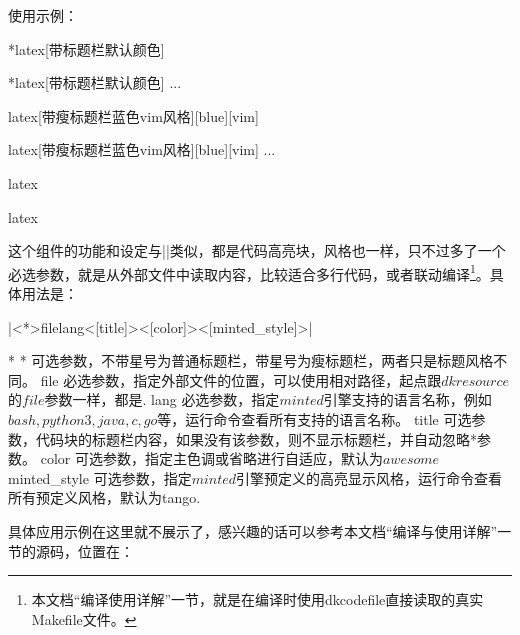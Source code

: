 使用示例：

\begin{dkcode}*{latex}[带标题栏默认颜色]
\begin{dkcode}*{latex}[带标题栏默认颜色]
  ...
\end{dkcode}

\begin{dkcode}{latex}[带瘦标题栏蓝色vim风格][blue][vim]
\begin{dkcode}{latex}[带瘦标题栏蓝色vim风格][blue][vim]
  ...
\end{dkcode}

\begin{dkcode}{latex}
\begin{dkcode}{latex}
\end{dkcode}

这个组件的功能和设定与|\dkcode|类似，都是代码高亮块，风格也一样，只不过多了一个必选参数，就是从外部文件中读取内容，比较适合多行代码，或者联动编译\footnote{本文档“编译使用详解”一节，就是在编译时使用dkcodefile直接读取的真实Makefile文件。}。具体用法是：

|\dkcodefile<*>{file}{lang}<[title]><[color]><[minted_style]>|

\begin{cvskills}*
  \cvskill
  {*}
  {可选参数，不带星号为普通标题栏，带星号为瘦标题栏，两者只是标题风格不同。}
  \cvskill
  {file}
  {必选参数，指定外部文件的位置，可以使用相对路径，起点跟$dkresource$的$file$参数一样，都是.}
  \cvskill
  {lang}
  {必选参数，指定$minted$引擎支持的语言名称，例如$bash, python3, java, c, go$等，运行命令查看所有支持的语言名称。}
  \cvskill
  {title}
  {可选参数，代码块的标题栏内容，如果没有该参数，则不显示标题栏，并自动忽略*参数。}
  \cvskill
  {color}
  {可选参数，指定主色调或省略进行自适应，默认为$awesome$}
  \cvskill
  {minted\_style}
  {可选参数，指定$minted$引擎预定义的高亮显示风格，运行命令查看所有预定义风格，默认为tango.}
\end{cvskills}


具体应用示例在这里就不展示了，感兴趣的话可以参考本文档“编译与使用详解”一节的源码，位置在：



\end{dkcode}
\end{dkcode}
\end{dkcode}
